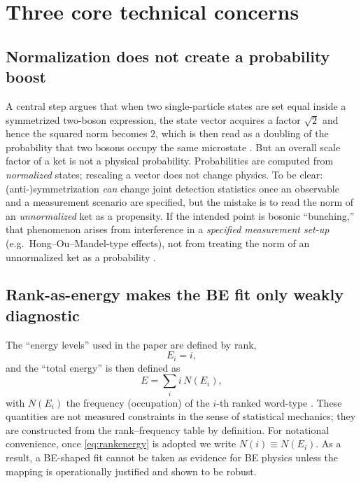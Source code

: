 \documentclass[11pt,a4paper]{article}
\begin{document}
\section{Three core technical concerns}

\subsection{Normalization does not create a probability boost}
A central step argues that when two single-particle states are set equal inside a symmetrized two-boson expression, the state vector acquires a factor $\sqrt{2}$ and hence the squared norm becomes $2$, which is then read as a doubling of the probability that two bosons occupy the same microstate \citep{Aerts2024Origin}.
But an overall scale factor of a ket is not a physical probability. Probabilities are computed from \emph{normalized} states; rescaling a vector does not change physics. To be clear: (anti-)symmetrization \emph{can} change joint detection statistics once an observable and a measurement scenario are specified, but the mistake is to read the norm of an \emph{unnormalized} ket as a propensity. If the intended point is bosonic ``bunching,'' that phenomenon arises from interference in a \emph{specified measurement set-up} (e.g.\ Hong--Ou--Mandel-type effects), not from treating the norm of an unnormalized ket as a probability \citep{HOM1987}.

\subsection{Rank-as-energy makes the BE fit only weakly diagnostic}
The ``energy levels'' used in the paper are defined by rank,
\begin{equation}
E_i = i,
\label{eq:rankenergy}
\end{equation}
and the ``total energy'' is then defined as
\begin{equation}
E = \sum_i i\,N(E_i),
\label{eq:constructedE}
\end{equation}
with $N(E_i)$ the frequency (occupation) of the $i$-th ranked word-type \citep{Aerts2024Origin}.
These quantities are not measured constraints in the sense of statistical mechanics; they are constructed from the rank--frequency table by definition. For notational convenience, once \eqref{eq:rankenergy} is adopted we write $N(i)\equiv N(E_i)$. As a result, a BE-shaped fit cannot be taken as evidence for BE physics unless the mapping is operationally justified and shown to be robust.
\end{document}
